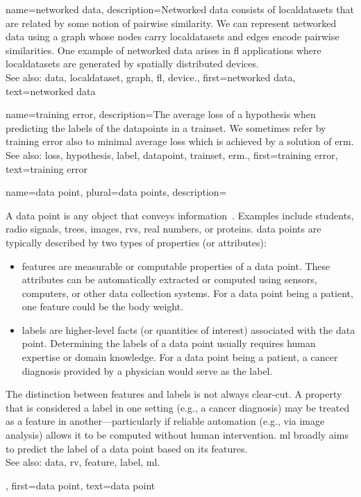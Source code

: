 {name={networked data},
	description={Networked \gls{data} consists of \glspl{localdataset} 
		that are related by some notion of pairwise similarity. We can represent networked 
		\gls{data} using a \gls{graph} whose nodes carry \glspl{localdataset} and edges encode 
		pairwise similarities. One example of networked \gls{data} arises in \gls{fl} applications 
		where \glspl{localdataset} are generated by spatially distributed \glspl{device}.
			\\
		See also: \gls{data}, \gls{localdataset}, \gls{graph}, \gls{fl}, \gls{device}.}, 
	first={networked data},
	text={networked data}  
}

{name={training error},
	description={The average \gls{loss} of a \gls{hypothesis} when 
		predicting the \glspl{label} of the \glspl{datapoint} in a \gls{trainset}. 
		We sometimes refer by training error also to minimal average \gls{loss} 
		which is achieved by a solution of \gls{erm}.
				\\
		See also: \gls{loss}, \gls{hypothesis}, \gls{label}, \gls{datapoint}, \gls{trainset}, \gls{erm}.},
	first={training error},
	text={training error}  
}

{name={data point}, 
 plural={data points},
	description={
	A \gls{data} point is any object that conveys information~\cite{coverthomas}. 
	Examples include students, radio signals, trees, images, \glspl{rv}, real numbers, 
 or proteins. \Gls{data} points are typically described by two types of properties (or attributes):
\begin{itemize}
    \item \Glspl{feature} are measurable or computable properties of a \gls{data} point. These 
    attributes can be automatically extracted or computed using sensors, computers, or other
	\gls{data} collection systems. For a \gls{data} point being a patient, one \gls{feature} 
	could be the body weight.
    \item \Glspl{label} are higher-level facts (or quantities of interest) 
	associated with the \gls{data} point. Determining the \glspl{label} of a \gls{data} point 
	usually requires human expertise or domain knowledge. For a \gls{data} point being a patient, 
	a cancer diagnosis provided by a physician would serve as the \gls{label}.
\end{itemize}
 The distinction between \glspl{feature} and \glspl{label} is not always clear-cut. 
 A property that is considered a \gls{label} in one setting (e.g., a cancer diagnosis) 
 may be treated as a \gls{feature} in another—particularly if reliable automation (e.g., 
 via image analysis) allows it to be computed without human intervention.
   \Gls{ml} broadly aims to predict the \gls{label} of a \gls{data} point based 
   on its \glspl{feature}.
				\\
		See also: \gls{data}, \gls{rv}, \gls{feature}, \gls{label}, \gls{ml}.}, 
	first={data point},
	text={data point}  
}


